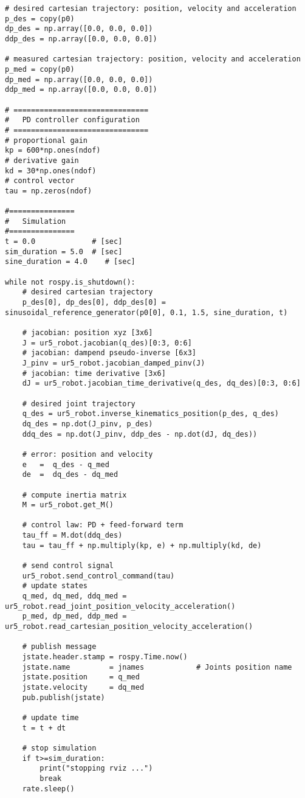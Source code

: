\begin{lstlisting}
# desired cartesian trajectory: position, velocity and acceleration
p_des = copy(p0)
dp_des = np.array([0.0, 0.0, 0.0])
ddp_des = np.array([0.0, 0.0, 0.0])

# measured cartesian trajectory: position, velocity and acceleration
p_med = copy(p0)
dp_med = np.array([0.0, 0.0, 0.0])
ddp_med = np.array([0.0, 0.0, 0.0])

# ===============================
#   PD controller configuration
# ===============================
# proportional gain
kp = 600*np.ones(ndof)
# derivative gain
kd = 30*np.ones(ndof)
# control vector
tau = np.zeros(ndof)    

#===============
#   Simulation
#===============
t = 0.0             # [sec] 
sim_duration = 5.0  # [sec]
sine_duration = 4.0    # [sec]

while not rospy.is_shutdown():
    # desired cartesian trajectory
    p_des[0], dp_des[0], ddp_des[0] = sinusoidal_reference_generator(p0[0], 0.1, 1.5, sine_duration, t)

    # jacobian: position xyz [3x6]
    J = ur5_robot.jacobian(q_des)[0:3, 0:6] 
    # jacobian: dampend pseudo-inverse [6x3] 
    J_pinv = ur5_robot.jacobian_damped_pinv(J)
    # jacobian: time derivative [3x6]
    dJ = ur5_robot.jacobian_time_derivative(q_des, dq_des)[0:3, 0:6]
    
    # desired joint trajectory
    q_des = ur5_robot.inverse_kinematics_position(p_des, q_des)
    dq_des = np.dot(J_pinv, p_des)
    ddq_des = np.dot(J_pinv, ddp_des - np.dot(dJ, dq_des))

    # error: position and velocity
    e 	=  q_des - q_med
    de 	=  dq_des - dq_med    

    # compute inertia matrix
    M = ur5_robot.get_M()

    # control law: PD + feed-forward term
    tau_ff = M.dot(ddq_des)
    tau = tau_ff + np.multiply(kp, e) + np.multiply(kd, de)
    
    # send control signal
    ur5_robot.send_control_command(tau)
    # update states
    q_med, dq_med, ddq_med = ur5_robot.read_joint_position_velocity_acceleration()
    p_med, dp_med, ddp_med = ur5_robot.read_cartesian_position_velocity_acceleration()

    # publish message
    jstate.header.stamp = rospy.Time.now()
    jstate.name 		= jnames			# Joints position name
    jstate.position 	= q_med
    jstate.velocity 	= dq_med
    pub.publish(jstate)

    # update time
    t = t + dt
    
    # stop simulation
    if t>=sim_duration:
        print("stopping rviz ...")
        break
    rate.sleep()
\end{lstlisting}

